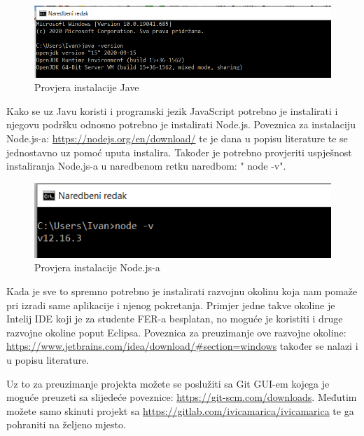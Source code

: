 			\begin{figure}[H]
				\includegraphics[scale=0.6]{slike/Java.PNG} %
				\centering
				\caption{Provjera instalacije Jave}
				\label{fig:java}
			\end{figure}
			
			Kako se uz Javu koristi i programski jezik JavaScript potrebno je instalirati i njegovu podršku odnosno potrebno je instalirati Node.js. Poveznica za instalaciju Node.js-a: \url{https://nodejs.org/en/download/} te je dana u popisu literature te se jednostavno uz pomoć uputa instalira. Također je potrebno provjeriti uspješnost instaliranja Node.js-a u naredbenom retku naredbom: " node -v".
			
			\begin{figure}[H]
				\includegraphics[scale=0.6]{slike/node.PNG} %
				\centering
				\caption{Provjera instalacije Node.js-a}
				\label{fig:node}
			\end{figure}
		
		Kada je sve to spremno potrebno je instalirati razvojnu okolinu koja nam pomaže pri izradi same aplikacije i njenog pokretanja. Primjer jedne takve okoline je Intelij IDE koji je za studente FER-a besplatan, no moguće je koristiti i druge razvojne okoline poput Eclipsa. Poveznica za preuzimanje ove razvojne okoline:  \url{https://www.jetbrains.com/idea/download/#section=windows}  također se nalazi i u popisu literature.
		
		Uz to za preuzimanje projekta možete se poslužiti sa Git GUI-em kojega je moguće preuzeti sa slijedeće poveznice: \url{https://git-scm.com/downloads}. Međutim možete samo skinuti projekt sa \url{https://gitlab.com/ivicamarica/ivicamarica} te ga pohraniti na željeno mjesto.
		
